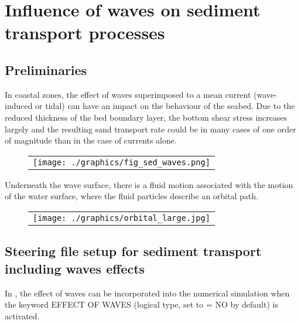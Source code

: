 \chapter[Influence of waves on sediment transport]{Influence of waves on sediment transport processes}\label{ch:sed_waves}

\section{Preliminaries}
In coastal zones, the effect of waves superimposed to a mean current (wave-induced or tidal) can have an impact on the behaviour of the seabed. Due to the reduced thickness of the bed boundary layer, the bottom shear stress increases largely and the resulting sand transport rate could be in many cases of one order of magnitude than in the case of currents alone. 

\begin{figure}[H]%
  \begin{center}
\begin{tabular}{c}
\texttt{[image: ./graphics/fig\_sed\_waves.png]}
\end{tabular}
\end{center}
\end{figure}

Underneath the wave surface, there is a fluid motion associated with the motion of the water surface, where the fluid particles describe an orbital path.

\begin{figure}[H]%
  \begin{center}
\begin{tabular}{c}
\texttt{[image: ./graphics/orbital\_large.jpg]}
\end{tabular}
\end{center}
\end{figure}

\section{Steering file setup for sediment transport including waves effects}
In \sisyphe{}, the effect of waves can be incorporated into the numerical simulation when the keyword 
 {\ttfamily EFFECT OF WAVES} (logical type, set to {\ttfamily = NO} by default) is activated. 

